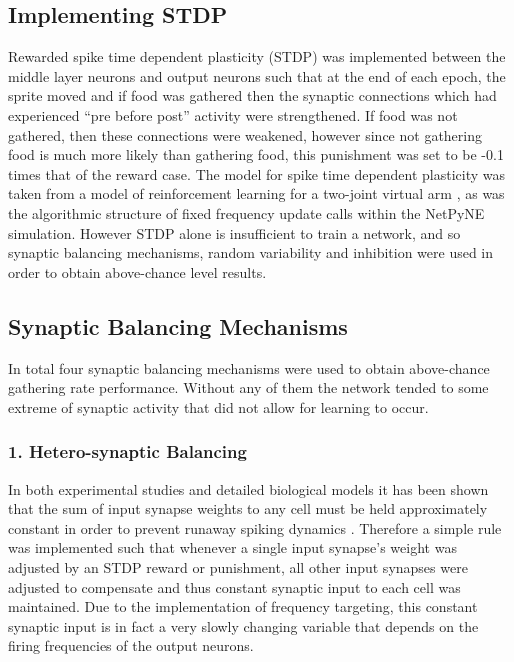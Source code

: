\documentclass[11pt, twocolumn]{article}
\begin{document}
\subsection*{Implementing \acs{STDP}}
Rewarded spike time dependent plasticity (\acs{STDP}) was implemented between the middle layer neurons and output neurons such that at the end of each epoch, the sprite moved and if food was gathered then the synaptic connections which had experienced ``pre before post'' activity were strengthened. If food was not gathered, then these connections were weakened, however since not gathering food is much more likely than gathering food, this punishment was set to be -0.1 times that of the reward case. The model for spike time dependent plasticity was taken from a model of reinforcement learning for a two-joint virtual arm \cite{neymotin2013reinforcement} \cite{chadderdon2012reinforcement}, as was the algorithmic structure of fixed frequency update calls within the NetPyNE simulation. However \acs{STDP} alone is insufficient to train a network, and so synaptic balancing mechanisms, random variability and inhibition were used in order to obtain above-chance level results.

\subsection*{Synaptic Balancing Mechanisms}
In total four synaptic balancing mechanisms were used to obtain above-chance gathering rate performance. Without any of them the network tended to some extreme of synaptic activity that did not allow for learning to occur.

\subsubsection*{1. Hetero-synaptic Balancing}
In both experimental studies and detailed biological models it has been shown that the sum of input synapse weights to any cell must be held approximately constant in order to prevent runaway spiking dynamics \cite{sanda2017multi}. Therefore a simple rule was implemented such that whenever a single input synapse's weight was adjusted by an \acs{STDP} reward or punishment, all other input synapses were adjusted to compensate and thus constant synaptic input to each cell was maintained. Due to the implementation of frequency targeting, this constant synaptic input is in fact a very slowly changing variable that depends on the firing frequencies of the output neurons.
\end{document}
